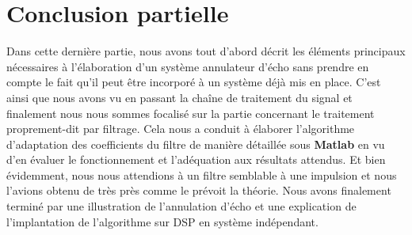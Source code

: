 \section{Conclusion partielle}
Dans cette dernière partie, nous avons tout d'abord décrit les éléments principaux nécessaires à l'élaboration d'un système annulateur d'écho sans prendre en compte le fait qu'il peut être incorporé à un système déjà mis en place. C'est ainsi que nous avons vu en passant la chaîne de traitement du signal et finalement nous nous sommes focalisé sur la partie concernant le traitement proprement-dit par filtrage. Cela nous a conduit à élaborer l'algorithme d'adaptation des coefficients du filtre de manière détaillée sous \textbf{Matlab} en vu d'en évaluer le fonctionnement et l'adéquation aux résultats attendus. Et bien évidemment, nous nous attendions à un filtre semblable à une impulsion  et nous l'avions obtenu de très près comme le prévoit la théorie. Nous avons finalement terminé par une illustration de l'annulation d'écho et une explication de l'implantation de l'algorithme sur DSP en système indépendant.